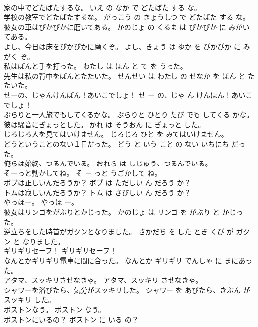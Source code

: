 \documentclass[8pt]{extreport}
\begin{document}
\begin{CJK}{UTF8}{min}
\\	家の中でどたばたするな。	いえ の なか で どたばた する な。	
\\	学校の教室でどたばたするな。	がっこう の きょうしつ で どたばた する な。	
\\	彼女の車はぴかぴかに磨いてある。	かのじょ の くるま は ぴかぴか に みがいてある。	
\\	よし、今日は床をぴかぴかに磨くぞ。	よし、きょう は ゆか を ぴかぴか に みがく ぞ。	
\\	私はぽんと手を打った。	わたし は ぽん と て を うった。	
\\	先生は私の背中をぽんとたたいた。	せんせい は わたし の せなか を ぽん と たたいた。	
\\	せーの、じゃんけんぽん！あいこでしょ！	せ ー の、じゃ ん けんぽん！あいこ でしょ！	
\\	ぶらりと一人旅でもしてくるかな。	ぶらりと ひとり たび でも してくる かな。	
\\	彼は騒音にぎょっとした。	かれ は そうおん に ぎょっと した。	
\\	じろじろ人を見てはいけません。	じろじろ ひと を みてはいけません。	
\\	どうということのない１日だった。	どう と いう こと の ない いちにち だった。	
\\	俺らは始終、つるんでいる。	おれら は しじゅう、つるんでいる。	
\\	そーっと動かしてね。	そ ー っと うごかして ね。	
\\	ボブは正しいんだろうか？	ボブ は ただしい ん だろう か？	
\\	トムは寂しいんだろうか？	トム は さびしい ん だろう か？	
\\	やっほー。	やっほ ー。	
\\	彼女はリンゴをがぶりとかじった。	かのじょ は リンゴ を がぶり と かじった。	
\\	逆立ちをした時首がガクンとなりました。	さかだち を した とき くび が ガクン と なりました。	
\\	ギリギリセーフ！	ギリギリセーフ！	
\\	なんとかギリギリ電車に間に合った。	なんとか ギリギリ でんしゃ に まにあった。	
\\	アタマ、スッキリさせなきゃ。	アタマ、スッキリ させなきゃ。	
\\	シャワーを浴びたら、気分がスッキリした。	シャワー を あびたら、きぶん が スッキリ した。	
\\	ボストンなう。	ボストン なう。	
\\	ボストンにいるの？	ボストン に いる の？	

\end{CJK}
\end{document}
